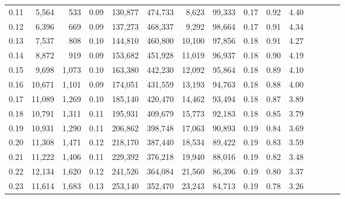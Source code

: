 \begin{tabular}{rrrcrrrrrrrrrrr}
0.11 &   5,564 &    533 &                                       0.09 &  130,877 &  474,733 &    8,623 &   99,333 &  0.17 &  0.92 &                         4.40 \\
0.12 &   6,396 &    669 &                                       0.09 &  137,273 &  468,337 &    9,292 &   98,664 &  0.17 &  0.91 &                         4.34 \\
0.13 &   7,537 &    808 &                                       0.10 &  144,810 &  460,800 &   10,100 &   97,856 &  0.18 &  0.91 &                         4.27 \\
0.14 &   8,872 &    919 &                                       0.09 &  153,682 &  451,928 &   11,019 &   96,937 &  0.18 &  0.90 &                         4.19 \\
0.15 &   9,698 &  1,073 &                                       0.10 &  163,380 &  442,230 &   12,092 &   95,864 &  0.18 &  0.89 &                         4.10 \\
0.16 &  10,671 &  1,101 &                                       0.09 &  174,051 &  431,559 &   13,193 &   94,763 &  0.18 &  0.88 &                         4.00 \\
0.17 &  11,089 &  1,269 &                                       0.10 &  185,140 &  420,470 &   14,462 &   93,494 &  0.18 &  0.87 &                         3.89 \\
0.18 &  10,791 &  1,311 &                                       0.11 &  195,931 &  409,679 &   15,773 &   92,183 &  0.18 &  0.85 &                         3.79 \\
0.19 &  10,931 &  1,290 &                                       0.11 &  206,862 &  398,748 &   17,063 &   90,893 &  0.19 &  0.84 &                         3.69 \\
0.20 &  11,308 &  1,471 &                                       0.12 &  218,170 &  387,440 &   18,534 &   89,422 &  0.19 &  0.83 &                         3.59 \\
0.21 &  11,222 &  1,406 &                                       0.11 &  229,392 &  376,218 &   19,940 &   88,016 &  0.19 &  0.82 &                         3.48 \\
0.22 &  12,134 &  1,620 &                                       0.12 &  241,526 &  364,084 &   21,560 &   86,396 &  0.19 &  0.80 &                         3.37 \\
0.23 &  11,614 &  1,683 &                                       0.13 &  253,140 &  352,470 &   23,243 &   84,713 &  0.19 &  0.78 &                         3.26 \\

\end{tabular}
